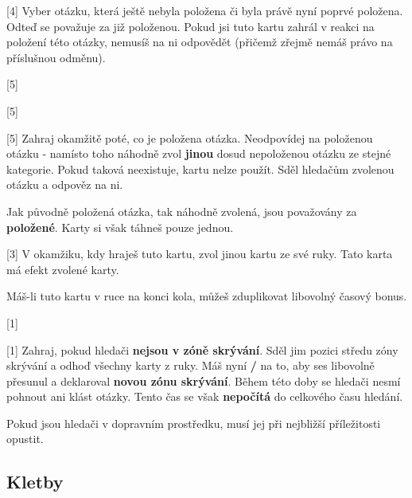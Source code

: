 \begin{cards}
	 Vyber otázku, která ještě nebyla položena či byla právě nyní poprvé položena. Odteď se považuje za již položenou. Pokud jsi tuto kartu zahrál v reakci na položení této otázky, nemusíš na ni odpovědět (přičemž zřejmě nemáš právo na příslušnou odměnu).



	 Zahraj okamžitě poté, co je položena otázka. Neodpovídej na položenou otázku - namísto toho náhodně zvol \textbf{jinou} dosud nepoloženou otázku ze stejné kategorie. Pokud taková neexistuje, kartu nelze použít. Sděl hledačům zvolenou otázku a odpověz na ni.

	Jak původně položená otázka, tak náhodně zvolená, jsou považovány za \textbf{položené}. Karty si však táhneš pouze jednou.

	 V okamžiku, kdy hraješ tuto kartu, zvol jinou kartu ze své ruky. Tato karta má efekt zvolené karty.

	Máš-li tuto kartu v ruce na konci kola, můžeš zduplikovat libovolný časový bonus.


	 Zahraj, pokud hledači \textbf{nejsou v zóně skrývání}. Sděl jim pozici středu zóny skrývání a odhoď všechny karty z ruky. Máš nyní \textbf{\timehidingmove/} na to, aby ses libovolně přesunul a deklaroval \textbf{novou zónu skrývání}. Během této doby se hledači nesmí pohnout ani klást otázky. Tento čas se však \textbf{nepočítá} do celkového času hledání.

	Pokud jsou hledači v dopravním prostředku, musí jej při nejbližší příležitosti opustit.
\end{cards}

\subsection{Kletby}\label{kletby}

